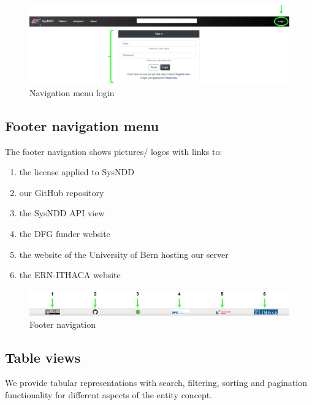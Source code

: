 \documentclass[
]{article}
\providecommand{\tightlist}{%
  \setlength{\itemsep}{0pt}\setlength{\parskip}{0pt}}
\begin{document}
\begin{figure}
\centering
\includegraphics{./static/img/02_05-navigation-menu-login.png}
\caption{Navigation menu login}
\end{figure}

\hypertarget{footer-navigation-menu}{%
\subsection{Footer navigation menu}\label{footer-navigation-menu}}

The footer navigation shows pictures/ logos with links to:

\begin{enumerate}
\def\labelenumi{\arabic{enumi})}
\tightlist
\item
  the license applied to SysNDD
\item
  our GitHub repository
\item
  the SysNDD API view
\item
  the DFG funder website
\item
  the website of the University of Bern hosting our server
\item
  the ERN-ITHACA website
\end{enumerate}

\begin{figure}
\centering
\includegraphics{./static/img/02_06-footer-menu.png}
\caption{Footer navigation}
\end{figure}

\hypertarget{table-views}{%
\subsection{Table views}\label{table-views}}

We provide tabular representations with search, filtering, sorting and pagination functionality for different aspects of the entity concept.
\end{document}
